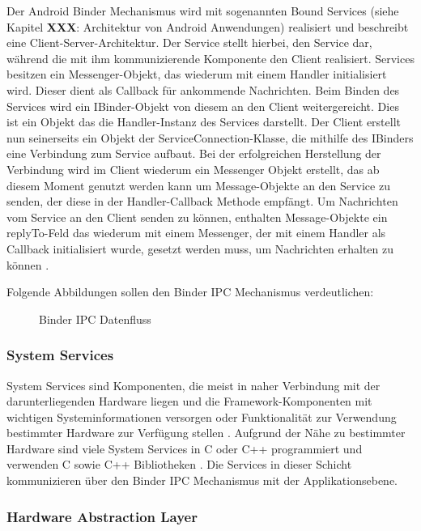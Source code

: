 Der Android Binder Mechanismus wird mit sogenannten Bound Services (siehe Kapitel \textbf{XXX}: Architektur von Android Anwendungen) realisiert und beschreibt eine Client-Server-Architektur. Der Service stellt hierbei, den Service dar, während die mit ihm kommunizierende Komponente den Client realisiert. Services besitzen ein Messenger-Objekt, das wiederum mit einem Handler initialisiert wird. Dieser dient als Callback für ankommende Nachrichten. Beim Binden des Services wird ein IBinder-Objekt von diesem an den Client weitergereicht. Dies ist ein Objekt das die Handler-Instanz des Services darstellt. Der Client erstellt nun seinerseits ein Objekt der ServiceConnection-Klasse, die mithilfe des IBinders eine Verbindung zum Service aufbaut. Bei der erfolgreichen Herstellung der Verbindung wird im Client wiederum ein Messenger Objekt erstellt, das ab diesem Moment genutzt werden kann um Message-Objekte an den Service zu senden, der diese in der Handler-Callback Methode empfängt. 
Um Nachrichten vom Service an den Client senden zu können, enthalten Message-Objekte ein replyTo-Feld das wiederum mit einem Messenger, der mit einem Handler als Callback initialisiert wurde, gesetzt werden muss, um Nachrichten erhalten zu können \cite{android-ipc-mechanism}. 

Folgende Abbildungen sollen den Binder IPC Mechanismus verdeutlichen: 

\begin{figure}[h]
	\caption{Binder IPC Datenfluss}
\end{figure}

\subsubsection{System Services}

System Services sind Komponenten, die meist in naher Verbindung mit der darunterliegenden Hardware liegen und die Framework-Komponenten mit wichtigen Systeminformationen versorgen oder Funktionalität zur Verwendung bestimmter Hardware zur Verfügung stellen \cite{android-architecture, structure-of-android-os}. Aufgrund der Nähe zu bestimmter Hardware sind viele System Services in C oder C++ programmiert und verwenden C sowie C++ Bibliotheken \cite{structure-of-android-os}. Die Services in dieser Schicht kommunizieren über den Binder IPC Mechanismus mit der Applikationsebene. 

\subsubsection{Hardware Abstraction Layer}


